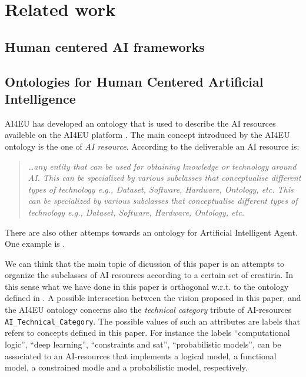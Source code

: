 \section{Related work}


\subsection{Human centered AI frameworks} 

\subsection{Ontologies for Human Centered Artificial Intelligence} 


AI4EU has developed an ontology that is used to describe the AI
resources availeble on the AI4EU platform \cite{ai4eu-D3.4}. 
The main concept introduced by the AI4EU ontology is the one of \emph{AI
  resource}. According to the deliverable an AI resource is:

\begin{quote}\it
\dots any entity that can be used for obtaining knowledge or
technology around AI. This can be specialized by various subclasses
that conceptualise different types of technology e.g., Dataset,
Software, Hardware, Ontology, etc. This can be specialized by various
subclasses that conceptualise different types of technology e.g.,
Dataset, Software, Hardware, Ontology, etc.
\end{quote}

There are also other attemps towards an ontology for Artificial
Intelligent Agent. One example is \cite{hawley2019challenges}. 

We can think that the main topic of dicussion of this paper is an
attempts to organize the subclasses of AI resources according to a
certain set of creatiria. In this sense what we have done in this
paper is orthogonal w.r.t. to the ontology defined in
\cite{ai4eu-D3}. A possible intersection between the vision
proposed in this paper, and the AI4EU ontology concerns also the
\emph{technical category}
tribute of AI-resources \texttt{AI\_Technical\_Category}. The possible
values of such an attributes are labels that refers to concepts
defined in this paper. For instance the labels ``computational logic'',
``deep learning'', ``constraints and sat'', ``probabilistic models'',
can be associated to an AI-resources that implements a logical model,
a functional model, a constrained modle and a probabilistic model,
respectively.

